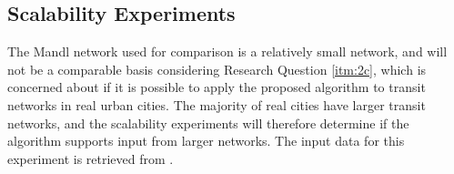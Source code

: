 \subsection{Scalability Experiments}
The Mandl network used for comparison is a relatively small network, and will not be a comparable basis considering Research Question \vref{itm:2c}, which is concerned about if it is possible to apply the proposed algorithm to transit networks in real urban cities. The majority of real cities have larger transit networks, and the scalability experiments will therefore determine if the algorithm supports input from larger networks. The input data for this experiment is retrieved from \citet{mumford13}.


